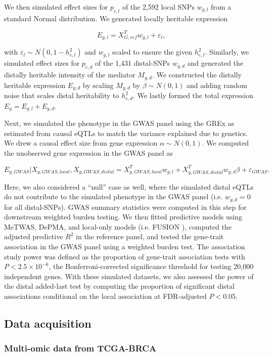 We then simulated
effect sizes for $p_{c,l}$ of
the 2,592 local
SNPs $w_{g,l}$ 
from a standard Normal distribution.
We generated locally heritable
expression 

$$E_{g,l} = X_{G,ref}^Tw_{g,l} + \varepsilon_l,$$

\noindent with $\varepsilon_l \sim N(0,1-h^2_{e,l})$
and $w_{g,l}$ scaled to ensure the given $h^2_{e,l}$.
Similarly, we simulated effect sizes
for $p_{c,d}$ of the 1,431 distal-SNPs
$w_{g,d}$ and generated the distally heritable
intensity of the mediator $M_{g,d}$. We constructed
the distally heritable expression $E_{g,d}$
by scaling $M_{g,d}$ by $\beta \sim N(0,1)$ and adding random noise
that scales distal heritability to $h^2_{e,d}$.
We lastly formed the total expression $E_g = E_{g,l} + E_{g,d}$.

Next, we simulated the phenotype
in the GWAS panel using the GREx as
estimated from causal eQTLs to match
the variance explained due to genetics. We drew a
causal effect size from gene expression $\alpha \sim N(0,1)$.
We computed the unobserved gene expression
in the GWAS panel as

$$E_{g,GWAS}|X_{g,GWAS,local},X_{g,GWAS,distal} = X_{g,GWAS,local}^Tw_{g,l} + 
X_{g,GWAS,distal}^Tw_{g,d}\beta + \varepsilon_{GWAS}.$$

\noindent Here, we also considered a ``null'' case as well, where the
simulated
distal eQTLs do not contribute to the simulated phenotype in the GWAS panel 
(i.e. $w_{g,d} = 0$
for all distal-SNPs). GWAS summary statistics
were computed in this step for downstream weighted
burden testing.
We then fitted predictive models using MeTWAS, DePMA,
and local-only models (i.e. FUSION \cite{Gusev2016}),
computed the adjusted predictive $R^2$
in the reference panel, and tested
the gene-trait association in the GWAS panel
using a weighted burden test.
The association study power was defined
as the proportion of gene-trait association
tests with $P < 2.5 \times 10^{-6}$,
the Bonferroni-corrected significance threshold
for testing 20,000 independent genes.
With these simulated datasets,
we also assessed the power
of the distal added-last test
by computing the proportion
of significant distal associations
conditional on the local association
at FDR-adjusted $P < 0.05$.

\subsection{Data acquisition}

\subsubsection{Multi-omic data from TCGA-BRCA}


